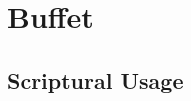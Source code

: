 \section{Buffet}
	\label{BUFFET}
	




	


\subsection{Scriptural Usage} %
	\label{BUFFET-SCRIPTURES}


